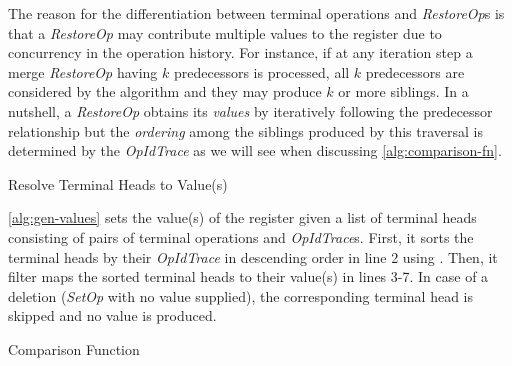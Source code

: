 \documentclass[sigplan,natbib=false,review]{acmart}
\newcommand{\setopkind}{\textit{SetOp}}
\newcommand{\restopkind}{\textit{RestoreOp}}
\newcommand{\opidtrace}{\textit{OpIdTrace}}
\begin{document}
The reason for the differentiation between terminal operations and
\restopkind{}s is that a \restopkind{} may contribute multiple values to
the register due to concurrency in the operation history.
For instance, if at any iteration step a merge \restopkind{} having $k$
predecessors is processed, all $k$ predecessors are considered by the algorithm
and they may produce $k$ or more siblings.
In a nutshell, a \restopkind{} obtains its \emph{values} by iteratively
following the predecessor relationship but the \emph{ordering} among the siblings
produced by this traversal is determined by the \opidtrace{} as we will
see when discussing \autoref{alg:comparison-fn}.

\begin{algorithm}
  \caption{Resolve Terminal Heads to Value(s)}\label{alg:gen-values}
  \begin{algorithmic}[1]
          \EndIf{}
        \EndFor{}
    \EndFunction{}
  \end{algorithmic}
\end{algorithm}

\autoref{alg:gen-values} sets the value(s) of the register
given a list of terminal heads consisting of pairs of terminal operations and
\opidtrace{}s.
First, it sorts the terminal heads by their \opidtrace{}
in descending order in line 2 using .
Then, it filter maps the sorted terminal heads to their value(s) in lines 3-7.
In case of a deletion (\setopkind{} with no value supplied),
the corresponding terminal head is skipped and no value is produced.

\begin{algorithm}
  \caption{Comparison Function}\label{alg:comparison-fn}
  \begin{algorithmic}[1]
        \EndIf{}
      \EndFor{}
    \EndFunction{}
  \end{algorithmic}
\end{algorithm}
\end{document}
